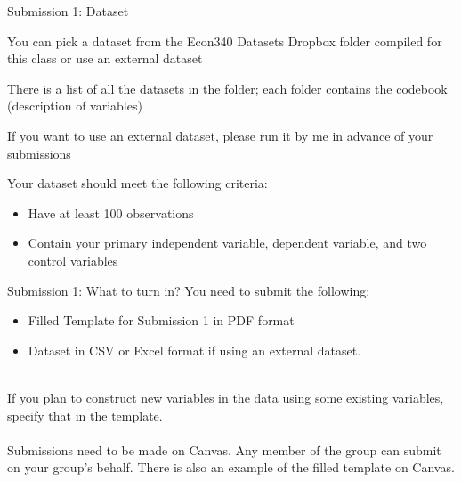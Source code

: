 \documentclass{./../Lectures/div_teaching_slides}
\begin{document}
\begin{frame}{Submission 1: Dataset}
\begin{witemize}
  \item You can pick a dataset from the Econ340 Datasets Dropbox folder compiled for this class or use an external dataset
  \item There is a list of all the datasets in the folder; each folder contains the codebook (description of variables)
  \item If you want to use an external dataset,  please run it by me in advance of your submissions
  \item Your dataset should meet the following criteria:\\
  \begin{itemize}
  \item Have at least 100 observations
  \item Contain your primary independent variable, dependent variable, and two control variables
  \end{itemize}
\end{witemize}
\end{frame}

\begin{frame}{Submission 1: What to turn in?}
You need to submit the following: \\
\begin{itemize}
\item Filled Template for Submission 1 in PDF format
\item Dataset in CSV or Excel format if using an external dataset. \\~\\
\end{itemize}
If you plan to construct new variables in the data using some existing variables, specify that in the template. \\~\\
Submissions need to be made on Canvas. Any member of the group can submit on your group's behalf. There is also an example of the filled template on Canvas. 
\end{frame}

\section{}
\end{document}
